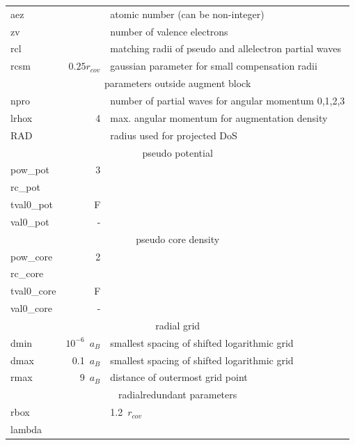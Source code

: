 \documentclass[11pt,a4paper]{report}
\begin{document}
\begin{tabular}{|l|r|l|}
\hline
aez        & & atomic number (can be non-integer) \\
zv         & & number of valence electrons   \\
rcl        & & matching radii of pseudo and allelectron partial waves\\
rcsm       & $0.25 r_{cov}$& gaussian parameter for small compensation radii\\
\hline
\multicolumn{3}{|c|}{parameters outside augment block}\\
\hline
npro       &     & number of partial waves for angular momentum 0,1,2,3\\
lrhox      &  4   & max. angular momentum for augmentation density\\
RAD        &     & radius used for projected DoS\\
\hline
\multicolumn{3}{|c|}{pseudo potential}\\
\hline
pow\_pot   & 3 & \\
rc\_pot    & & \\
tval0\_pot & F & \\
val0\_pot  & - & \\
\hline
\multicolumn{3}{|c|}{pseudo core density}\\
\hline
pow\_core  & 2 & \\
rc\_core   & & \\
tval0\_core& F & \\
val0\_core & - & \\
\hline
\multicolumn{3}{|c|}{radial grid}\\
\hline
dmin       & $10^{-6}$~$a_B$& smallest spacing of shifted logarithmic grid\\
dmax       & 0.1~$a_B$ & smallest spacing of shifted logarithmic grid\\
rmax       & 9~$a_B$ & distance of outermost grid point \\
\hline
\multicolumn{3}{|c|}{radialredundant parameters}\\
\hline
rbox   & & 1.2~$r_{cov}$\\
lambda & & \\
\hline
\end{tabular}
\end{document}
